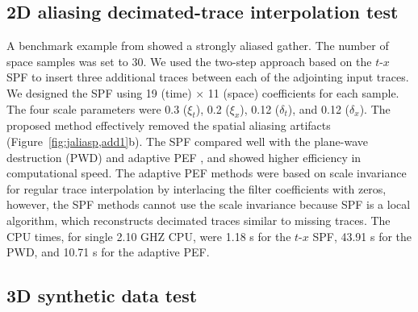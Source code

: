 \subsection{2D aliasing decimated-trace interpolation test}

A benchmark example from \cite{Claerbout09} showed a strongly aliased
gather.  The number of space samples was set to 30.  We used the
two-step approach based on the $t$-$x$ SPF to insert three additional
traces between each of the adjointing input traces.  We designed the
SPF using 19 (time) $\times$ 11 (space) coefficients for each sample.
The four scale parameters were 0.3 ($\xi_t$), 0.2 ($\xi_x$), 0.12
($\delta_t$), and 0.12 ($\delta_x$). The proposed method effectively
removed the spatial aliasing artifacts
(Figure~\ref{fig:jaliasp,add1}b). The SPF compared well with the
plane-wave destruction (PWD) \cite[]{Fomel02} and adaptive PEF
\cite[]{Liu11}, and showed higher efficiency in computational
speed. The adaptive PEF methods were based on scale invariance for
regular trace interpolation by interlacing the filter coefficients
with zeros, however, the SPF methods cannot use the scale invariance
because SPF is a local algorithm, which reconstructs decimated traces
similar to missing traces. The CPU times, for single 2.10 GHZ CPU,
were 1.18 s for the $t$-$x$ SPF, 43.91 s for the PWD, and 10.71 s for
the adaptive PEF.


\subsection{3D synthetic data test}

